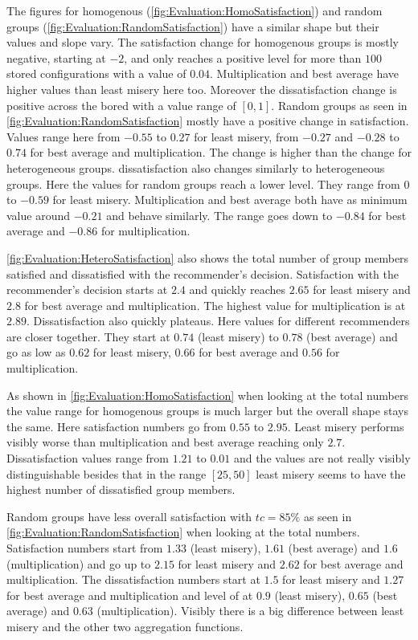 The figures for homogenous (\autoref{fig:Evaluation:HomoSatisfaction}) and random groups (\autoref{fig:Evaluation:RandomSatisfaction}) have a similar shape but their values and slope vary. The satisfaction change for homogenous groups is mostly negative, starting at $-2$, and only reaches a positive level for more than $100$ stored configurations with a value of $0.04$. Multiplication and best average have higher values than least misery here too. Moreover the dissatisfaction change is positive across the bored with a value range of $[0,1]$.
Random groups as seen in \autoref{fig:Evaluation:RandomSatisfaction} mostly have a positive change in satisfaction. Values range here from $-0.55$ to $0.27$ for least misery, from $-0.27$ and $-0.28$ to $0.74$ for best average and multiplication. The change is higher than the change for heterogeneous groups. dissatisfaction also changes similarly to heterogeneous groups. Here the values for random groups reach a lower level. They range from $0$ to $-0.59$ for least misery. Multiplication and best average both have as minimum value around $-0.21$ and behave similarly. The range goes down to $-0.84$ for best average and $-0.86$ for multiplication.

\autoref{fig:Evaluation:HeteroSatisfaction} also shows the total number of group members satisfied and dissatisfied with the recommender's decision. Satisfaction with the recommender's decision starts at $2.4$ and quickly reaches $2.65$ for least misery and $2.8$ for best average and multiplication. The highest value for multiplication is at $2.89$. Dissatisfaction also  quickly plateaus. Here values for different recommenders are closer together. They start at $0.74$ (least misery) to $0.78$ (best average) and go as low as $0.62$ for least misery, $0.66$ for best average and $0.56$ for multiplication.

As shown in \autoref{fig:Evaluation:HomoSatisfaction} when looking at the total numbers the value range for homogenous groups is much larger but the overall shape stays the same. Here satisfaction numbers go from $0.55$ to $2.95$. Least misery performs visibly worse than multiplication and best average reaching only $2.7$. Dissatisfaction values range from $1.21$ to $0.01$ and the values are not really visibly distinguishable besides that in the range $[25,50]$ least misery seems to have the highest number of dissatisfied group members.

Random groups have less overall satisfaction with $tc = 85\%$ as seen in \autoref{fig:Evaluation:RandomSatisfaction} when looking at the total numbers. Satisfaction numbers start from $1.33$ (least misery), $1.61$ (best average) and $1.6$ (multiplication) and go up to $2.15$ for least misery and $2.62$ for best average and multiplication. The dissatisfaction numbers start at $1.5$ for least misery and $1.27$ for best average and multiplication and level of at $0.9$ (least misery), $0.65$ (best average) and $0.63$ (multiplication). Visibly there is a big difference between least misery and the other two aggregation functions.

